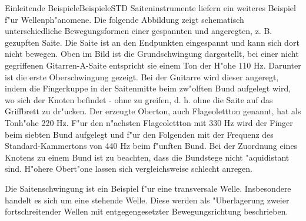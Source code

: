 \begin{MXContent}{Einleitende Beispiele}{Beispiele}{STD}
Saiteninstrumente liefern ein weiteres Beispiel f"ur Wellenph"anomene. Die folgende Abbildung zeigt schematisch unterschiedliche Bewegungsformen einer gespannten und angeregten, z. B. gezupften Saite. Die Saite ist an den Endpunkten eingespannt und kann sich dort nicht bewegen. Oben im Bild ist die Grundschwingung dargestellt, bei einer nicht gegriffenen Gitarren-A-Saite entspricht sie einem Ton der H"ohe 110 Hz. Darunter ist die erste Oberschwingung gezeigt. Bei der Guitarre wird dieser angeregt, indem die Fingerkuppe in der Saitenmitte beim zw"olften Bund aufgelegt wird, wo sich der Knoten befindet - ohne zu greifen, d. h. ohne die Saite auf das Griffbrett zu dr"ucken. Der erzeugte Oberton, auch Flageolettton genannt, hat als Tonh"ohe 220 Hz. F"ur den n"achsten Flageolettton mit 330 Hz wird der Finger beim siebten Bund aufgelegt und f"ur den Folgenden mit der Frequenz des Standard-Kammertons von 440 Hz beim f"unften Bund. Bei der Zuordnung eines Knotens zu einem Bund ist zu beachten, dass die Bundstege nicht "aquidistant sind. H"ohere Obert"one lassen sich vergleichsweise schlecht anregen.


Die Saitenschwingung ist ein Beispiel f"ur eine transversale Welle. Insbesondere handelt es sich um eine stehende Welle. Diese werden als "Uberlagerung zweier fortschreitender Wellen mit entgegengesetzter Bewegungsrichtung beschrieben.

\end{MXContent}


